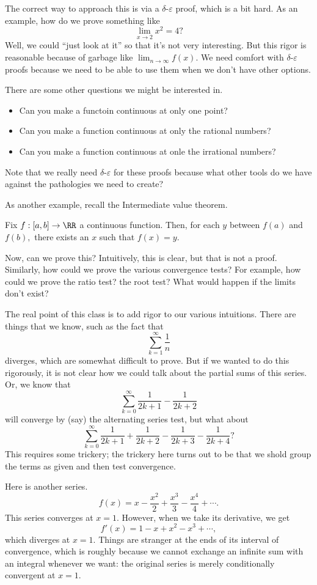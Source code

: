 The correct way to approach this is via a $\delta$-$\varepsilon$ proof, which is a bit hard. As an example, how do we prove something like
\[\lim_{x\to2}x^2=4?\]
Well, we could ``just look at it'' so that it's not very interesting. But this rigor is reasonable because of garbage like $\lim_{n\to\infty}f(x).$ We need comfort with $\delta$-$\varepsilon$ proofs because we need to be able to use them when we don't have other options.

There are some other questions we might be interested in.
\begin{itemize}
	\item Can you make a functoin continuous at only one point?
	\item Can you make a function continuous at only the rational numbers?
	\item Can you make a function continuous at onle the irrational numbers?
\end{itemize}
Note that we really need $\delta$-$\varepsilon$ for these proofs because what other tools do we have against the pathologies we need to create?

As another example, recall the Intermediate value theorem.
\begin{thm}
	Fix $f:[a,b]\to\RR$ a continuous function. Then, for each $y$ between $f(a)$ and $f(b),$ there exists an $x$ such that $f(x)=y.$
\end{thm}
Now, can we prove this? Intuitively, this is clear, but that is not a proof. Similarly, how could we prove the various convergence tests? For example, how could we prove the ratio test? the root test? What would happen if the limits don't exist?

The real point of this class is to add rigor to our various intuitions. There are things that we know, such as the fact that
\[\sum_{k=1}^\infty\frac1n\]
diverges, which are somewhat difficult to prove. But if we wanted to do this rigorously, it is not clear how we could talk about the partial sums of this series. Or, we know that
\[\sum_{k=0}^\infty\frac1{2k+1}-\frac1{2k+2}\]
will converge by (say) the alternating series test, but what about
\[\sum_{k=0}^\infty\frac1{2k+1}+\frac1{2k+2}-\frac1{2k+3}-\frac1{2k+4}?\]
This requires some trickery; the trickery here turns out to be that we shold group the terms as given and then test convergence.

Here is another series.
\[f(x)=x-\frac{x^2}2+\frac{x^3}3-\frac{x^4}4+\cdots.\]
This series converges at $x=1.$ However, when we take its derivative, we get
\[f'(x)=1-x+x^2-x^3+\cdots,\]
which diverges at $x=1.$ Things are stranger at the ends of its interval of convergence, which is roughly because we cannot exchange an infinite sum with an integral whenever we want: the original series is merely conditionally convergent at $x=1.$


